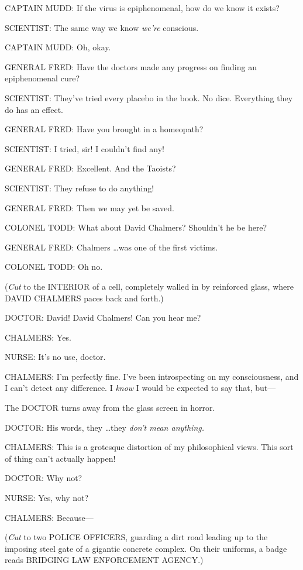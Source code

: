 {
 CAPTAIN MUDD: If the virus is epiphenomenal, how do we know it
exists?}

{
 SCIENTIST: The same way we know \textit{we're}
conscious.}

{
 CAPTAIN MUDD: Oh, okay.}

{
 GENERAL FRED: Have the doctors made any progress on finding an
epiphenomenal cure?}

{
 SCIENTIST: They've tried every placebo in the
book. No dice. Everything they do has an effect.}

{
 GENERAL FRED: Have you brought in a homeopath?}

{
 SCIENTIST: I tried, sir! I couldn't find any!}

{
 GENERAL FRED: Excellent. And the Taoists?}

{
 SCIENTIST: They refuse to do anything!}

{
 GENERAL FRED: Then we may yet be saved.}

{
 COLONEL TODD: What about David Chalmers? Shouldn't
he be here?}

{
 GENERAL FRED: Chalmers \ldots was one of the first victims.}

{
 COLONEL TODD: Oh no.}

{
 (\textit{Cut} to the INTERIOR of a cell, completely walled in by
reinforced glass, where DAVID CHALMERS paces back and forth.)}

{
 DOCTOR: David! David Chalmers! Can you hear me?}

{
 CHALMERS: Yes.}

{
 NURSE: It's no use, doctor.}

{
 CHALMERS: I'm perfectly fine. I've
been introspecting on my consciousness, and I can't
detect any difference. I \textit{know} I would be expected to say that,
but---}

{
 The DOCTOR turns away from the glass screen in horror.}

{
 DOCTOR: His words, they \ldots they \textit{don't
mean anything.}}

{
 CHALMERS: This is a grotesque distortion of my philosophical
views. This sort of thing can't actually happen!}

{
 DOCTOR: Why not?}

{
 NURSE: Yes, why not?}

{
 CHALMERS: Because---}

{
 (\textit{Cut} to two POLICE OFFICERS, guarding a dirt road leading
up to the imposing steel gate of a gigantic concrete complex. On their
uniforms, a badge reads BRIDGING LAW ENFORCEMENT AGENCY.)}

